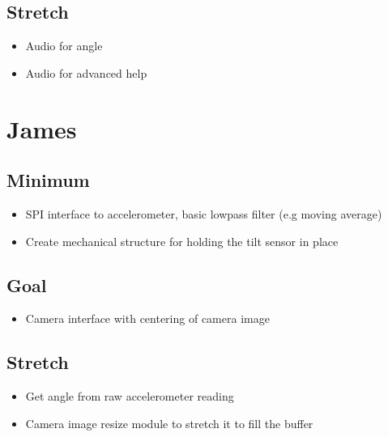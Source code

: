 \documentclass{article}
\begin{document}
\subsection{Stretch}
\begin{itemize}
    \item Audio for angle
    \item Audio for advanced help
\end{itemize}

\section{James}
\subsection{Minimum}
\begin{itemize}
    \item SPI interface to accelerometer, basic lowpass filter (e.g moving average)
    \item Create mechanical structure for holding the tilt sensor in place
\end{itemize}
\subsection{Goal}
\begin{itemize}
    \item Camera interface with centering of camera image
\end{itemize}
\subsection{Stretch}
\begin{itemize}
    \item Get angle from raw accelerometer reading
    \item Camera image resize module to stretch it to fill the buffer
\end{itemize}
\end{document}
